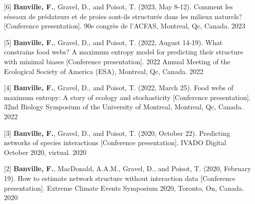 \begin{cventries}

  \cventry
    {[6] \textbf{Banville, F.}, Gravel, D., and Poisot, T. (2023, May 8-12). Comment les réseaux de prédateurs et de proies sont-ils structurés dans les milieux naturels? [Conference presentation]. 90e congrès de l’ACFAS, Montreal, Qc, Canada.} 
    {} {} {2023} 
    {
      \begin{cvitems} %
      \end{cvitems}
    }

  \cventry
    {[5] \textbf{Banville, F.}, Gravel, D., and Poisot, T. (2022, August 14-19). What constrains food webs? A maximum entropy model for predicting their structure with minimal biases [Conference presentation]. 2022 Annual Meeting of the Ecological Society of America (ESA), Montreal, Qc, Canada.}
    {} {} {2022} 
    {
      \begin{cvitems} %
      \end{cvitems}
    }

  \cventry
    {[4] \textbf{Banville, F.}, Gravel, D., and Poisot, T. (2022, March 25). Food webs of maximum entropy: A story of ecology and stochasticity [Conference presentation]. 32nd Biology Symposium of the University of Montreal, Montreal, Qc, Canada.} 
    {} {} {2022} 
    {
      \begin{cvitems} %
      \end{cvitems}
    }

  \cventry
    {[3] \textbf{Banville, F.}, Gravel, D., and Poisot, T. (2020, October 22). Predicting networks of species interactions [Conference presentation]. IVADO Digital October 2020, virtual.}
    {} {} {2020} 
    {
      \begin{cvitems} %
      \end{cvitems}
    }

  \cventry
    {[2] \textbf{Banville, F.}, MacDonald, A.A.M., Gravel, D., and Poisot, T. (2020, February 19). How to estimate network structure without interaction data [Conference presentation]. Extreme Climate Events Symposium 2020, Toronto, On, Canada.}
    {} {} {2020} 
    {
      \begin{cvitems} %
      \end{cvitems}
    }


\end{cventries}
